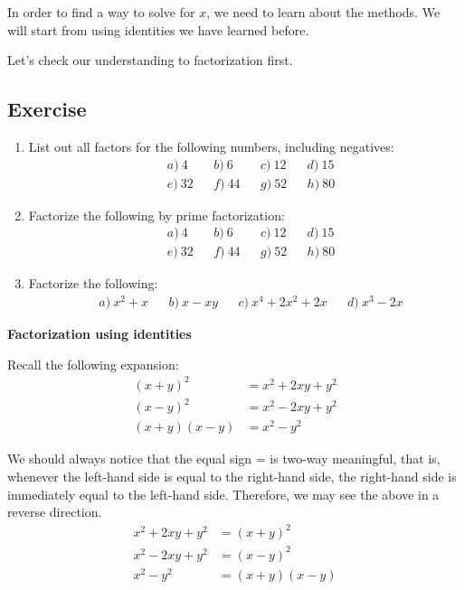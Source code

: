 \documentclass[12pt]{article}
\begin{document}
    In order to find a way to solve for $x$, we need to learn about the methods. We will start from using identities we have learned before.

    Let's check our understanding to factorization first.
    \subsection*{Exercise}
    \begin{enumerate}
        \item List out all factors for the following numbers, including negatives:\begin{align*}
            &a)\ 4&&b)\ 6&&c)\ 12&&d)\ 15\\
            &e)\ 32&&f)\ 44&&g)\ 52&&h)\ 80
        \end{align*}
        \item Factorize the following by prime factorization:\begin{align*}
            &a)\ 4&&b)\ 6&&c)\ 12&&d)\ 15\\
            &e)\ 32&&f)\ 44&&g)\ 52&&h)\ 80
        \end{align*}
        \item Factorize the following:\begin{align*}
            &a)\ x^2+x&&b)\ x-xy&&c)\ x^4+2x^2+2x&&d)\ x^3-2x
        \end{align*}
    \end{enumerate}

    \begin{center}
        \textbf{Factorization using identities}
    \end{center}

    Recall the following expansion:\begin{align*}
        (x+y)^2&=x^2+2xy+y^2\\
        (x-y)^2&=x^2-2xy+y^2\\
        (x+y)(x-y)&=x^2-y^2
    \end{align*}

    We should always notice that the equal sign = is two-way meaningful, that is, whenever the left-hand side is equal to the right-hand side, the right-hand side is immediately equal to the left-hand side. Therefore, we may see the above in a reverse direction.\begin{align*}
        x^2+2xy+y^2&=(x+y)^2\\
        x^2-2xy+y^2&=(x-y)^2\\
        x^2-y^2&=(x+y)(x-y)
    \end{align*}
\end{document}
